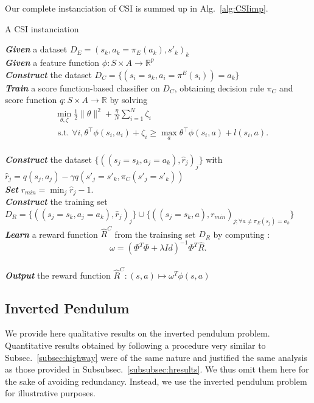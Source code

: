 \documentclass[smallextended]{svjour3}
\begin{document}
Our complete instanciation of CSI is summed up in Alg.~\ref{alg:CSIimp}.
\begin{algorithm}%
  \caption{A CSI instanciation}
  \label{alg:CSIimp}
  \emph{\textbf{Given}} a dataset  $D_E = (s_k,a_k=\pi_E(a_k),s'_k)_k$\;\\
  \emph{\textbf{Given}} a feature function $\phi: S\times A \rightarrow \mathbb{R}^p$\;\\
  \emph{\textbf{Construct}} the dataset $D_C=\{(s_i=s_k,a_i=\pi^E(s_i))=a_k\}$ \;\\
  \emph{\textbf{Train}} a score function-based classifier on $D_C$, obtaining decision rule $\pi_C$ and score function $q:S\times A \rightarrow \mathbb R$ by solving \begin{eqnarray*}
  &\min_{\theta,\zeta}\frac{1}{2}\|\theta\|^2 +
  \frac{\eta}{N}\sum_{i=1}^N \zeta_i \\
  &\text{~s.t.~} \forall i,
  \theta^\top{\phi}(s_i,a_i)+\zeta_i \geq \max_a \theta^\top
  {\phi}(s_i,a) + l(s_i,a). \label{eq:qp_taskar}
\end{eqnarray*}\;\\
\emph{\textbf{Construct}} the dataset $\{((s_{j}=s_k,a_{j}=a_k),\hat r_j)_j\}$ with $\hat r_j = q(s_j,a_j) - \gamma q(s'_j=s'_k,\pi_C(s'_j=s'_k))$\;\\
\emph{\textbf{Set}} $r_{min} = \min_j\hat r_j - 1.$\;\\
\emph{\textbf{Construct}} the training set  $D_R = \{((s_{j}=s_k,a_{j}=a_k),\hat r_j)_j\}\cup\{((s_j=s_k,a),r_{min})_{j;\forall a\neq \pi_E(s_j) = a_k}\}$ \;\\
\emph{\textbf{Learn}} a reward function $\hat R^C$ from the trainsing set $D_R$ by computing :
\begin{equation*}
  \omega = (\Phi^T\Phi + \lambda Id)^{-1}\Phi^T\hat R.
\end{equation*}\;\\
\emph{\textbf{Output}} the reward function $\hat R^{C}: (s,a) \mapsto \omega^T \phi(s,a)$ \;
\end{algorithm}

\subsection{Inverted Pendulum}
\label{subsec:IP}
We provide here qualitative results on the inverted pendulum problem. Quantitative results obtained by following a procedure very similar to Subsec.~\ref{subsec:highway} were of the same nature and justified the same analysis as those provided in Subsubsec.~\ref{subsubsec:hresults}. We thus omit them here for the sake of avoiding redundancy. Instead, we use the inverted pendulum problem for illustrative purposes.
\end{document}
